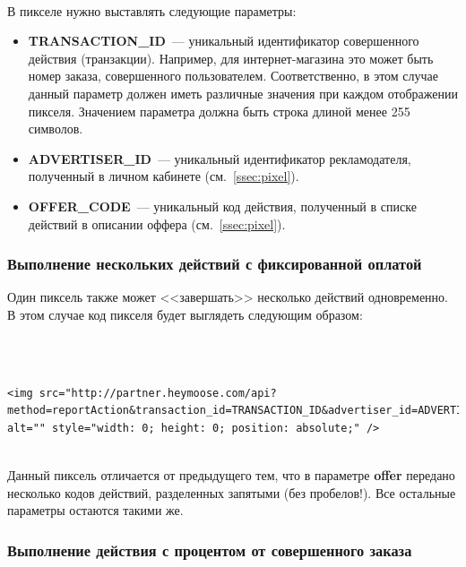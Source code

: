 \documentclass[a4paper,12pt]{article}
\begin{document}
~\\

В пикселе нужно выставлять следующие параметры:

\begin{itemize}
\item \textbf{TRANSACTION\_ID}~--- уникальный идентификатор совершенного действия (транзакции). Например, для интернет-магазина это может быть номер заказа, совершенного пользователем. Соответственно, в этом случае данный параметр должен иметь различные значения при каждом отображении пикселя. Значением параметра должна быть строка длиной менее 255 символов.
\item \textbf{ADVERTISER\_ID}~--- уникальный идентификатор рекламодателя, полученный в личном кабинете (см.~\ref{ssec:pixel}).
\item \textbf{OFFER\_CODE}~--- уникальный код действия, полученный в списке действий в описании оффера (см.~\ref{ssec:pixel}).
\end{itemize}

\subsubsection{Выполнение нескольких действий с фиксированной оплатой}
\label{sssec:fix-multiple}

Один пиксель также может <<завершать>> несколько действий одновременно. В этом случае код пикселя будет выглядеть следующим образом:

~\\

~\\

\begin{lstlisting}[language=Pixel]
<img src="http://partner.heymoose.com/api?method=reportAction&transaction_id=TRANSACTION_ID&advertiser_id=ADVERTISER_ID&offer=OFFER_CODE1,OFFER_CODE2,OFFER_CODE3" 
alt="" style="width: 0; height: 0; position: absolute;" />
\end{lstlisting}

~\\

Данный пиксель отличается от предыдущего тем, что в параметре \textbf{offer} передано несколько кодов действий, разделенных запятыми (без пробелов!). Все остальные параметры остаются такими же.

\subsubsection{Выполнение действия с процентом от совершенного заказа}
\end{document}
